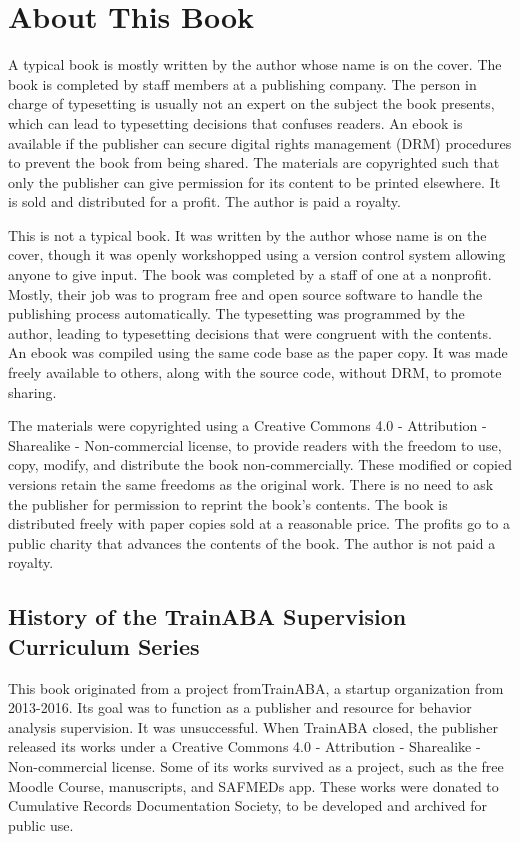 \documentclass[float=false, crop=false]{standalone}
\begin{document}
\chapter{About This Book}

A typical book is mostly written by the author whose name is on the cover. The book is completed by staff members at a publishing company. The person in charge of typesetting is usually not an expert on the subject the book presents, which can lead to typesetting decisions that confuses readers. An ebook is available if the publisher can secure digital rights management (DRM) procedures to prevent the book from being shared. The materials are copyrighted such that only the publisher can give permission for its content to be printed elsewhere. It is sold and distributed for a profit. The author is paid a royalty.

This is not a typical book. It was written by the author whose name is on the cover, though it was openly workshopped using a version control system allowing anyone to give input. The book was completed by a staff of one at a nonprofit. Mostly, their job was to program free and open source software to handle the publishing process automatically. The typesetting was programmed by the author, leading to typesetting decisions that were congruent with the contents. An ebook was compiled using the same code base as the paper copy. It was made freely available to others, along with the source code, without DRM, to promote sharing.

The materials were copyrighted using a Creative Commons 4.0 - Attribution - Sharealike - Non-commercial license, to provide readers with the freedom to use, copy, modify, and distribute the book non-commercially. These modified or copied versions retain the same freedoms as the original work. There is no need to ask the publisher for permission to reprint the book's contents. The book is distributed freely with paper copies sold at a reasonable price. The profits go to a public charity that advances the contents of the book. The author is not paid a royalty.

\section{History of the TrainABA Supervision Curriculum Series}
This book originated from a project fromTrainABA, a startup organization from 2013-2016. Its goal was to function as a publisher and resource for behavior analysis supervision. It was unsuccessful. When TrainABA closed, the publisher released its works under a Creative Commons 4.0 - Attribution - Sharealike - Non-commercial license. Some of its works survived as a project, such as the free Moodle Course, manuscripts, and SAFMEDs app. These works were donated to Cumulative Records Documentation Society, to be developed and archived for public use. 
\end{document}
